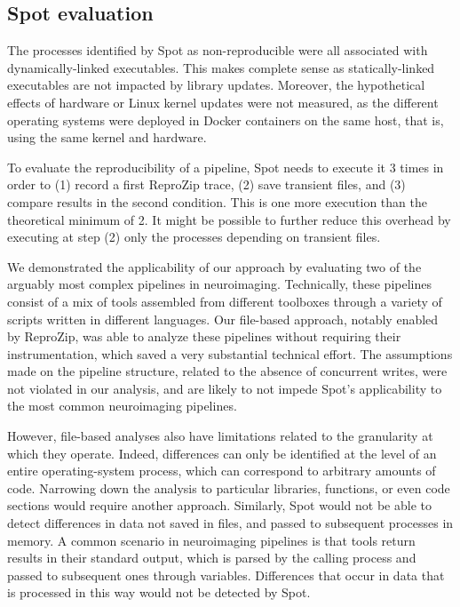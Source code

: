 \documentclass[a4paper,num-refs]{oup-contemporary}
\newcommand{\reprozip}[0]{ReproZip\xspace}
\newcommand{\toolname}[0]{Spot\xspace}
\begin{document}
\subsection{\toolname evaluation}

The processes identified by \toolname as non-reproducible were all
associated with dynamically-linked executables. 
This makes complete sense as statically-linked executables are not
impacted by library updates. Moreover, the hypothetical effects of
hardware or Linux kernel updates were not measured, as the different
operating systems were deployed in Docker containers on the same host, that
is, using the same kernel and hardware.

To evaluate the reproducibility of a pipeline, \toolname needs to execute
it 3 times in order to (1) record a first \reprozip trace, (2) save
transient files, and (3) compare results in the second condition. This is
one more execution than the theoretical minimum of 2. It might be possible
to further reduce this overhead by executing at step (2) only the
processes depending on transient files.

We demonstrated the applicability of our approach by evaluating two of the
arguably most complex pipelines in neuroimaging. Technically, these
pipelines consist of a mix of tools assembled from different toolboxes
through a variety of scripts written in different languages. Our file-based
approach, notably enabled by \reprozip, was able to analyze these pipelines
without requiring their instrumentation, which saved a very substantial
technical effort. The assumptions made on the pipeline structure, related
to the absence of concurrent writes, were not violated in our analysis, and
are likely to not impede \toolname's applicability to the most common
neuroimaging pipelines.

However, file-based analyses also have limitations related to the
granularity at which they operate. Indeed, differences can only be
identified at the level of an entire operating-system process, which can
correspond to arbitrary amounts of code. Narrowing down the analysis to
particular libraries, functions, or even code sections would require
another approach. Similarly, \toolname would not be able to detect
differences in data not saved in files, and passed to subsequent processes
in memory. A common scenario in neuroimaging pipelines is that tools return
results in their standard output, which is parsed by the calling process
and passed to subsequent ones through variables. Differences that occur in data 
that is processed in this way would not be detected by \toolname.  
\end{document}
